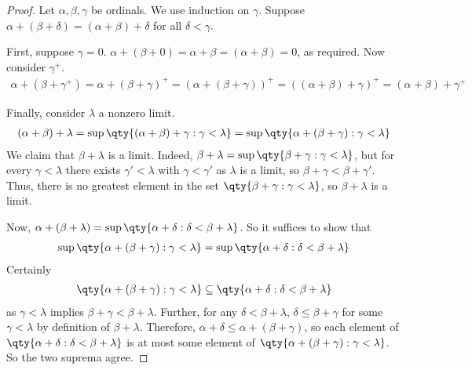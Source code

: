 \begin{proof}
    Let $\alpha, \beta, \gamma$ be ordinals.
    We use induction on $\gamma$.
    Suppose $\alpha + (\beta + \delta) = (\alpha + \beta) + \delta$ for all $\delta < \gamma$.

    First, suppose $\gamma = 0$.
    $\alpha + (\beta + 0) = \alpha + \beta = (\alpha + \beta) = 0$, as required.
    Now consider $\gamma^+$.
    \begin{align*}
       \alpha + (\beta + \gamma^+) = \alpha + (\beta + \gamma)^+ = (\alpha + (\beta + \gamma))^+ = ((\alpha + \beta) + \gamma)^+ = (\alpha + \beta) + \gamma^+
    \end{align*}

    Finally, consider $\lambda$ a nonzero limit.
    \begin{align*}
       (\alpha + \beta) + \lambda = \sup \qty{(\alpha + \beta) + \gamma : \gamma < \lambda} = \sup \qty{\alpha + (\beta + \gamma) : \gamma < \lambda}
    \end{align*}
    We claim that $\beta + \lambda$ is a limit.
    Indeed, $\beta + \lambda = \sup\qty{\beta + \gamma : \gamma < \lambda}$, but for every $\gamma < \lambda$ there exists $\gamma' < \lambda$ with $\gamma < \gamma'$ as $\lambda$ is a limit, so $\beta + \gamma < \beta + \gamma'$.
    Thus, there is no greatest element in the set $\qty{\beta + \gamma : \gamma < \lambda}$, so $\beta + \lambda$ is a limit.

    Now, $\alpha + (\beta + \lambda) = \sup\qty{\alpha + \delta : \delta < \beta + \lambda}$.
    So it suffices to show that
    \begin{align*}
       \sup\qty{\alpha + (\beta + \gamma) : \gamma < \lambda} = \sup\qty{\alpha + \delta : \delta < \beta + \lambda}
    \end{align*}
    Certainly
    \begin{align*}
       \qty{\alpha + (\beta + \gamma) : \gamma < \lambda} \subseteq \qty{\alpha + \delta : \delta < \beta + \lambda}
    \end{align*}
    as $\gamma < \lambda$ implies $\beta + \gamma < \beta + \lambda$.
    Further, for any $\delta < \beta + \lambda$, $\delta \leq \beta + \gamma$ for some $\gamma < \lambda$ by definition of $\beta + \lambda$.
    Therefore, $\alpha + \delta \leq \alpha + (\beta + \gamma)$, so each element of $\qty{\alpha + \delta : \delta < \beta + \lambda}$ is at most some element of $\qty{\alpha + (\beta + \gamma) : \gamma < \lambda}$.
    So the two suprema agree.
\end{proof}
